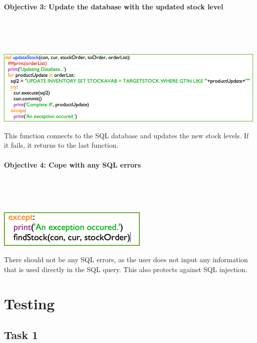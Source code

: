 \documentclass[a4paper]{article}
\begin{document}
\paragraph{Objective 3: Update the database with the updated stock level} ~\par ~\par
\noindent\includegraphics{task3_obj3_1.png} \par 
This function connects to the SQL database and updates the new stock levels. If it fails, it returns to the last function. 
\paragraph{Objective 4: Cope with any SQL errors} ~\par ~\par
\noindent\includegraphics{task3_obj4_1.png} \par 
There should not be any SQL errors, as the user does not input any information that is used directly in the SQL query. This also protects against SQL injection.

\newpage

\section{Testing}
\subsection{Task 1}
\end{document}
